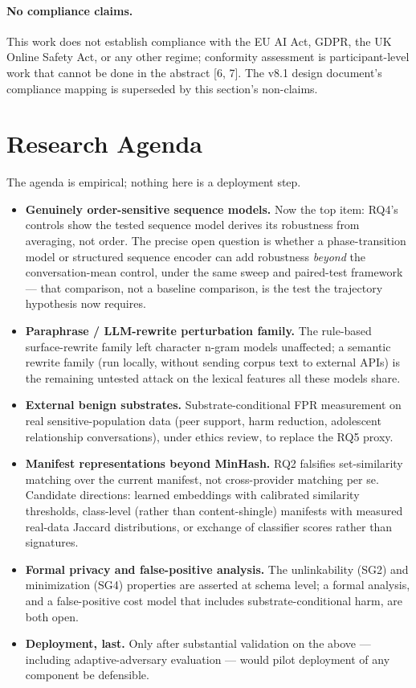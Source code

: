 \documentclass[11pt]{article}
\begin{document}
\paragraph{No compliance claims.}
This work does not establish compliance with the EU AI Act, GDPR, the UK Online Safety Act, or any other regime; conformity assessment is participant-level work that cannot be done in the abstract [6, 7]. The v8.1 design document's compliance mapping is superseded by this section's non-claims.

\section{Research Agenda}
\label{sec:agenda}

The agenda is empirical; nothing here is a deployment step.

\begin{itemize}[leftmargin=1.5em]
\item \textbf{Genuinely order-sensitive sequence models.} Now the top item: RQ4's controls show the tested sequence model derives its robustness from averaging, not order. The precise open question is whether a phase-transition model or structured sequence encoder can add robustness \emph{beyond} the conversation-mean control, under the same sweep and paired-test framework --- that comparison, not a baseline comparison, is the test the trajectory hypothesis now requires.
\item \textbf{Paraphrase / LLM-rewrite perturbation family.} The rule-based surface-rewrite family left character n-gram models unaffected; a semantic rewrite family (run locally, without sending corpus text to external APIs) is the remaining untested attack on the lexical features all these models share.
\item \textbf{External benign substrates.} Substrate-conditional FPR measurement on real sensitive-population data (peer support, harm reduction, adolescent relationship conversations), under ethics review, to replace the RQ5 proxy.
\item \textbf{Manifest representations beyond MinHash.} RQ2 falsifies set-similarity matching over the current manifest, not cross-provider matching per se. Candidate directions: learned embeddings with calibrated similarity thresholds, class-level (rather than content-shingle) manifests with measured real-data Jaccard distributions, or exchange of classifier scores rather than signatures.
\item \textbf{Formal privacy and false-positive analysis.} The unlinkability (SG2) and minimization (SG4) properties are asserted at schema level; a formal analysis, and a false-positive cost model that includes substrate-conditional harm, are both open.
\item \textbf{Deployment, last.} Only after substantial validation on the above --- including adaptive-adversary evaluation --- would pilot deployment of any component be defensible.
\end{itemize}
\end{document}

